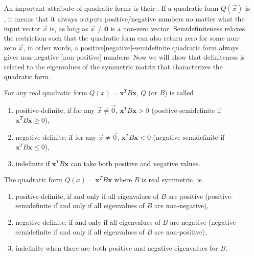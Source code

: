 An important attribute of quadratic forms is their . If a quadratic form $Q(\vec{x})$ is , it means that it always outputs positive/negative numbers no matter what the input vector $\vec{x}$ is, as long as $\vec{x} \neq \textbf{0}$ is a non-zero vector. Semidefiniteness relaxes the restriction such that the quadratic form can also return zero for some non-zero $\vec{x}$, in other words, a positive[negative]-semidefinite quadratic form always gives non-negative [non-positive] numbers. Now we will show that definiteness is related to the eigenvalues of the symmetric matrix that characterizes the quadratic form.
\begin{defn}
\label{defn:quaddefinite}
For any real quadratic form $Q(x) = \textbf{x}^T B\textbf{x}$, $Q$ (or $B$) is called
\begin{enumerate}[label=(\alph*)]
\item positive-definite, if for any $\vec{x} \neq \vec{0}$, $\textbf{x}^T B\textbf{x} > 0$ (positive-semidefinite if $\textbf{x}^T B\textbf{x} \geq 0$), 
\item negative-definite, if for any $\vec{x} \neq \vec{0}$, $\textbf{x}^T B\textbf{x} < 0$ (negative-semidefinite if $\textbf{x}^T B\textbf{x} \leq 0$), 
\item indefinite if $\textbf{x}^T B\textbf{x}$ can take both positive and negative values.
\end{enumerate}
\end{defn}
\begin{thm}
\label{thm:quaddefinite}
The quadratic form $Q(x) = \textbf{x}^T B\textbf{x}$ where $B$ is real symmetric, is
\begin{enumerate}[label=(\alph*)]
\item positive-definite, if and only if all eigenvalues of $B$ are positive (positive-semidefinite if and only if all eigenvalues of $B$ are non-negative), 
\item negative-definite, if and only if all eigenvalues of $B$ are negative (negative-semidefinite if and only if all eigenvalues of $B$ are non-positive), 
\item indefinite when there are both positive and negative eigenvalues for $B$.
\end{enumerate}
\end{thm}

